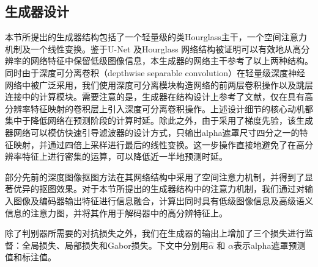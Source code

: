 \subsection{生成器设计}
本节所提出的生成器结构包括了一个轻量级的类Hourglass\cite{newell2016stacked}主干，一个空间注意力机制及一个线性变换。鉴于U-Net\cite{ronneberger2015u} 及Hourglass \cite{newell2016stacked}网络结构被证明可以有效地从高分辨率的网络特征中保留低级图像信息，本生成器的网络主干参考了以上两种结构。同时由于深度可分离卷积（depthwise separable convolution）在轻量级深度神经网络中被广泛采用\cite{chollet2017xception,howard2017mobilenets,zhang2018shufflenet,sandler2018mobilenetv2}，我们使用深度可分离模块构造网络的前两层卷积操作以及跳层连接中的计算模块。需要注意的是，生成器在结构设计上参考了文献\parencite{nekrasov2018real}，仅在具有高分辨率特征映射的卷积层上引入深度可分离卷积操作。上述设计细节的核心动机都集中于降低网络在预测阶段的计算时延。除此之外，由于采用了梯度先验，该生成器网络可以模仿快速引导滤波器\cite{he2015fast}的设计方式，只输出alpha遮罩尺寸四分之一的特征映射，并通过四倍上采样进行最后的线性变换。这一步操作直接地避免了在高分辨率特征上进行密集的运算，可以降低近一半地预测时延。

部分先前的深度图像抠图方法\cite{chen2018semantic,zhu2017fast}在其网络结构中采用了空间注意力机制\cite{xu2015show}，并得到了显著优异的抠图效果。对于本节所提出的生成器结构中的注意力机制，我们通过对输入图像及编码器输出特征进行信息融合，计算出同时具有低级图像信息及高级语义信息的注意力图，并将其作用于解码器中的高分辨特征上。

除了判别器所需要的对抗损失之外，我们在生成器的输出上增加了三个损失进行监督：全局损失、局部损失和Gabor损失。下文中分别用$ \hat{\alpha} $ 和 $ {\alpha} $表示alpha遮罩预测值和标注值。

